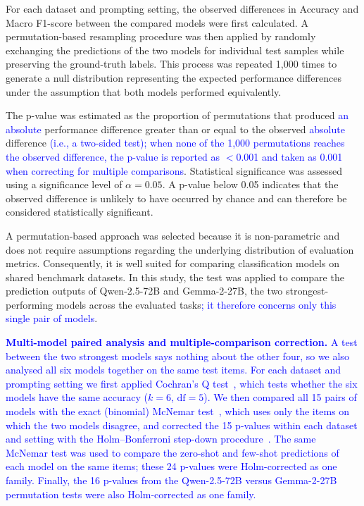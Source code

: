 \documentclass[10pt,letterpaper]{article}
\newcommand{\rev}[1]{\textcolor{blue}{#1}}
\begin{document}
For each dataset and prompting setting, the observed differences in Accuracy and Macro F1-score between the compared models were first calculated. A permutation-based resampling procedure was then applied by randomly exchanging the predictions of the two models for individual test samples while preserving the ground-truth labels. This process was repeated 1,000 times to generate a null distribution representing the expected performance differences under the assumption that both models performed equivalently.

The p-value was estimated as the proportion of permutations that produced \rev{an absolute} performance difference greater than or equal to the observed \rev{absolute} difference \rev{(i.e., a two-sided test); when none of the 1,000 permutations reaches the observed difference, the p-value is reported as $<$0.001 and taken as 0.001 when correcting for multiple comparisons}. Statistical significance was assessed using a significance level of $\alpha = 0.05$. A p-value below 0.05 indicates that the observed difference is unlikely to have occurred by chance and can therefore be considered statistically significant.

A permutation-based approach was selected because it is non-parametric and does not require assumptions regarding the underlying distribution of evaluation metrics. Consequently, it is well suited for comparing classification models on shared benchmark datasets. In this study, the test was applied to compare the prediction outputs of Qwen-2.5-72B and Gemma-2-27B, the two strongest-performing models across the evaluated tasks\rev{; it therefore concerns only this single pair of models}.

\rev{\textbf{Multi-model paired analysis and multiple-comparison correction.} A test between the two strongest models says nothing about the other four, so we also analysed all six models together on the same test items. For each dataset and prompting setting we first applied Cochran's Q test~\cite{b57}, which tests whether the six models have the same accuracy ($k = 6$, $\mathrm{df} = 5$). We then compared all 15 pairs of models with the exact (binomial) McNemar test~\cite{b58,b59}, which uses only the items on which the two models disagree, and corrected the 15 p-values within each dataset and setting with the Holm--Bonferroni step-down procedure~\cite{b56,b60}. The same McNemar test was used to compare the zero-shot and few-shot predictions of each model on the same items; these 24 p-values were Holm-corrected as one family. Finally, the 16 p-values from the Qwen-2.5-72B versus Gemma-2-27B permutation tests were also Holm-corrected as one family.}
\end{document}
